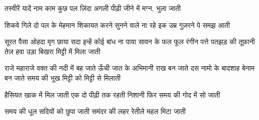 तस्वीरें यादें नाम काम कुछ पल ज़िंदा
अगली पीढ़ी जीने में मग्न, भुला जाती 

शिकवे गिले दो पल के मेहमान
शिकायत करने सुनने वाले ना रहे 
इक उम्र गुज़रने पे समझ आती

सूरत पैसा ओहदा मृग छाया
सदा इन्हें कोई बांध ना पाया
सावन के फल फूल रंगीन पत्ते 
पतझड़ की तूफ़ानी तेज़ हवा 
उड़ा बिखरा मिट्टी में मिला जाती

 
राजे महाराजे वक्त की नदी में बह जाते    
 ऊँची जात के अभिमानी राख बन जाते 
दस नामो के बादशाह बेनाम बन जाते 
समय की भूख मिट्टी को मिट्टी से मिलाती 

हैसियत खाक में मिल जाती
एक दो पीढ़ी तक रहती निशानी 
फिर समय की गोद में सो जाती

समय की धूल सदियों को छुपा जाती 
समंदर की लहर रेतीले महल मिटा जाती  
